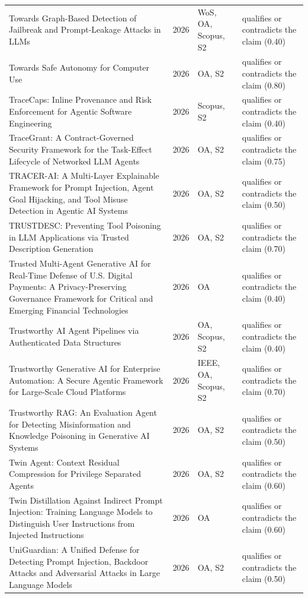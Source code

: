\begin{longtable}{@{}%
  >{\raggedright\arraybackslash}p{}c%
  >{\raggedright\arraybackslash}p{}%
  >{\raggedright\arraybackslash}p{}@{}}
Towards Graph-Based Detection of Jailbreak and Prompt-Leakage Attacks in LLMs & 2026 & WoS, OA, Scopus, S2 & qualifies or contradicts the claim (0.40) \\
Towards Safe Autonomy for Computer Use & 2026 & OA, S2 & qualifies or contradicts the claim (0.80) \\
TraceCaps: Inline Provenance and Risk Enforcement for Agentic Software Engineering & 2026 & Scopus, S2 & qualifies or contradicts the claim (0.40) \\
TraceGrant: A Contract-Governed Security Framework for the Task-Effect Lifecycle of Networked LLM Agents & 2026 & OA, S2 & qualifies or contradicts the claim (0.75) \\
TRACER-AI: A Multi-Layer Explainable Framework for Prompt Injection, Agent Goal Hijacking, and Tool Misuse Detection in Agentic AI Systems & 2026 & OA, S2 & qualifies or contradicts the claim (0.50) \\
TRUSTDESC: Preventing Tool Poisoning in LLM Applications via Trusted Description Generation & 2026 & OA, S2 & qualifies or contradicts the claim (0.70) \\
Trusted Multi-Agent Generative AI for Real-Time Defense of U.S. Digital Payments: A Privacy-Preserving Governance Framework for Critical and Emerging Financial Technologies & 2026 & OA & qualifies or contradicts the claim (0.40) \\
Trustworthy AI Agent Pipelines via Authenticated Data Structures & 2026 & OA, Scopus, S2 & qualifies or contradicts the claim (0.40) \\
Trustworthy Generative AI for Enterprise Automation: A Secure Agentic Framework for Large-Scale Cloud Platforms & 2026 & IEEE, OA, Scopus, S2 & qualifies or contradicts the claim (0.70) \\
Trustworthy RAG: An Evaluation Agent for Detecting Misinformation and Knowledge Poisoning in Generative AI Systems & 2026 & OA, S2 & qualifies or contradicts the claim (0.50) \\
Twin Agent: Context Residual Compression for Privilege Separated Agents & 2026 & OA, S2 & qualifies or contradicts the claim (0.60) \\
Twin Distillation Against Indirect Prompt Injection: Training Language Models to Distinguish User Instructions from Injected Instructions & 2026 & OA & qualifies or contradicts the claim (0.60) \\
UniGuardian: A Unified Defense for Detecting Prompt Injection, Backdoor Attacks and Adversarial Attacks in Large Language Models & 2026 & OA, S2 & qualifies or contradicts the claim (0.50) \\

\end{longtable}

